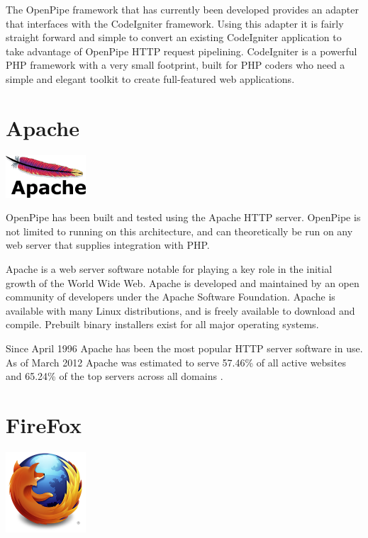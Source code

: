 \documentclass[12pt]{report}
\begin{document}
The OpenPipe framework that has currently been developed provides an adapter that interfaces with the CodeIgniter framework. Using this adapter it is fairly straight forward and simple to convert an existing CodeIgniter application to take advantage of OpenPipe HTTP request pipelining. CodeIgniter is a powerful PHP framework with a very small footprint, built for PHP coders who need a simple and elegant toolkit to create full-featured web applications. 


\section{Apache}
\begin{center} 
\includegraphics[width=30mm]{figures/images/apache_logo.png}
\end{center}

OpenPipe has been built and tested using the Apache HTTP server. OpenPipe is not limited to running on this architecture, and can theoretically be run on any web server that supplies integration with PHP.

Apache is a web server software notable for playing a key role in the initial growth of the World Wide Web. Apache is developed and maintained by an open community of developers under the Apache Software Foundation. Apache is available with many Linux distributions, and is freely available to download and compile. Prebuilt binary installers exist for all major operating systems.  

Since April 1996 Apache has been the most popular HTTP server software in use. As of March 2012 Apache was estimated to serve 57.46\% of all active websites and 65.24\% of the top servers across all domains \cite{webserverSurvey}.


\section{FireFox}
\begin{center} 
\includegraphics[width=30mm]{figures/images/firefox_logo.png}
\end{center}
\end{document}
